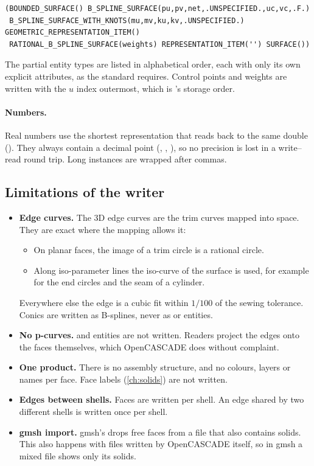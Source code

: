 \begin{lstlisting}[style=text]
(BOUNDED_SURFACE() B_SPLINE_SURFACE(pu,pv,net,.UNSPECIFIED.,uc,vc,.F.)
 B_SPLINE_SURFACE_WITH_KNOTS(mu,mv,ku,kv,.UNSPECIFIED.) GEOMETRIC_REPRESENTATION_ITEM()
 RATIONAL_B_SPLINE_SURFACE(weights) REPRESENTATION_ITEM('') SURFACE())
\end{lstlisting}

The partial entity types are listed in alphabetical order, each with only its own explicit
attributes, as the standard requires. Control points and weights are written with the
$u$ index outermost, which is \NF{}'s storage order.

\paragraph{Numbers.} Real numbers use the shortest representation that reads back to the same
double (). They always contain a decimal point (, ,
), so no precision is lost in a write--read round trip. Long instances are
wrapped after commas.

\subsection{Limitations of the writer}

\begin{itemize}
  \item \textbf{Edge curves.} The 3D edge curves are the trim curves mapped into space. They are
    exact where the mapping allows it:
    \begin{itemize}
      \item On planar faces, the image of a trim circle is a rational circle.
      \item Along iso-parameter lines the iso-curve of the surface is used, for example for the
        end circles and the seam of a cylinder.
    \end{itemize}
    Everywhere else the edge is a cubic fit within $1/100$ of the sewing tolerance. Conics are
    written as B-splines, never as  or  entities.
  \item \textbf{No p-curves.}  and  entities are not written.
    Readers project the edges onto the faces themselves, which OpenCASCADE does without
    complaint.
  \item \textbf{One product.} There is no assembly structure, and no colours, layers or names
    per face. Face labels (\cref{ch:solids}) are not written.
  \item \textbf{Edges between shells.} Faces are written per shell. An edge shared by two
    different shells is written once per shell.
  \item \textbf{gmsh import.} gmsh's  drops free faces from a file that also
    contains solids. This also happens with files written by OpenCASCADE itself, so in gmsh a
    mixed file shows only its solids.
\end{itemize}

